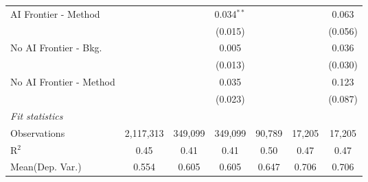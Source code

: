 \begin{tabular}{lcccccc}
   AI Frontier - Method    &               &               & 0.034$^{**}$  &               &              & 0.063\\   
                           &               &               & (0.015)       &               &              & (0.056)\\   
   No AI Frontier - Bkg.   &               &               & 0.005         &               &              & 0.036\\   
                           &               &               & (0.013)       &               &              & (0.030)\\   
   No AI Frontier - Method &               &               & 0.035         &               &              & 0.123\\   
                           &               &               & (0.023)       &               &              & (0.087)\\   
   \midrule
   \emph{Fit statistics}\\
   Observations            & 2,117,313     & 349,099       & 349,099       & 90,789        & 17,205       & 17,205\\  
   R$^2$                   & 0.45          & 0.41          & 0.41          & 0.50          & 0.47         & 0.47\\  
Mean(Dep. Var.) & 0.554 & 0.605 & 0.605 & 0.647 & 0.706 & 0.706 \\
   

\end{tabular}
